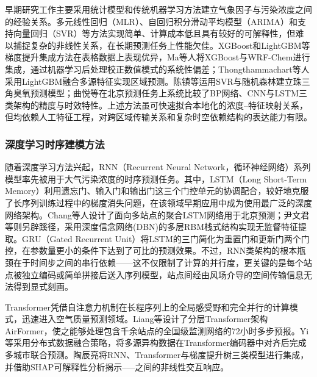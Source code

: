 早期研究工作主要采用统计模型和传统机器学习方法建立气象因子与污染浓度之间的经验关系。多元线性回归（MLR）、自回归积分滑动平均模型（ARIMA）和支持向量回归（SVR）等方法实现简单、计算成本低且具有较好的可解释性，但难以捕捉复杂的非线性关系，在长期预测任务上性能欠佳\citep{goyal2006statistical,wong2021using,leong2020prediction}。XGBoost和LightGBM等梯度提升集成方法在表格数据上表现优异，Ma等人\citep{ma2020application}将XGBoost与WRF-Chem进行集成，通过机器学习后处理校正数值模式的系统性偏差；Thongthammachart等人\citep{thongthammachart2021integrated}采用LightGBM融合多源特征实现区域\PM 预测。陈镇等\citep{cn_chenzhen2024zhujiang}运用SVR与随机森林建立珠三角臭氧预测模型；曲悦等\citep{cn_quyue2019}在北京\PM 预测任务上系统比较了BP网络、CNN与LSTM三类架构的精度与时效特性。上述方法虽可快速拟合本地化的浓度--特征映射关系，但均依赖人工特征工程，对跨区域传输关系和复杂时空依赖结构的表达能力有限\citep{xiao2018ensemble,chen2018machine}。

\subsubsection{深度学习时序建模方法}

随着深度学习方法兴起，RNN（Recurrent Neural Network，循环神经网络）系列模型率先被用于大气污染浓度的时序预测任务\citep{cn_zhuyanmin2020shendu}。其中，LSTM（Long Short-Term Memory）利用遗忘门、输入门和输出门这三个门控单元的协调配合，较好地克服了长序列训练过程中的梯度消失问题，在该领域早期应用中成为使用最广泛的深度网络架构\citep{li2017long}。Chang等人\citep{chang2020lstm}设计了面向多站点的聚合LSTM网络用于北京\PM 预测；尹文君等\citep{cn_yinwenjun2015dbn}则另辟蹊径，采用深度信念网络(DBN)的多层RBM栈式结构实现无监督特征提取。GRU（Gated Recurrent Unit）将LSTM的三门简化为重置门和更新门两个门控，在参数量更小的条件下达到了可比的预测效果\citep{faraji2022integrated}。不过，RNN类架构的根本瓶颈在于时间步之间的串行依赖——这不仅限制了计算的并行度，更关键的是每个站点被独立编码或简单拼接后送入序列模型，站点间经由风场介导的空间传输信息无法得到显式刻画。

Transformer\citep{vaswani2017attention}凭借自注意力机制在长程序列上的全局感受野和完全并行的计算模式，迅速进入空气质量预测领域。Liang等\citep{liang2023airformer}设计了分层Transformer架构AirFormer，使之能够处理包含千余站点的全国级监测网络的72小时多步预报。Yi等\citep{yi2018deep}采用分布式数据融合策略，将多源异构数据在Transformer编码器中对齐后完成多城市\PM 联合预测。陶辰亮\citep{cn_taochenliang2024}将RNN、Transformer与梯度提升树三类模型进行集成，并借助SHAP可解释性分析揭示\ozone--\NOx--\VOCs--\PM 之间的非线性交互响应。

